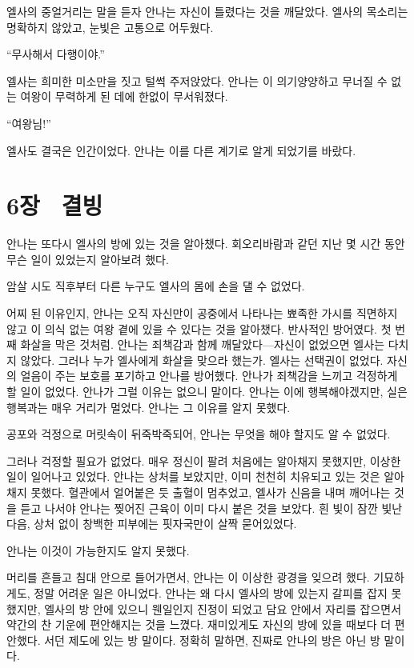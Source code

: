 엘사의 중얼거리는 말을 듣자 안나는 자신이 틀렸다는 것을 깨달았다. 엘사의 목소리는 명확하지 않았고, 눈빛은 고통으로 어두웠다.

``무사해서 다행이야.''

엘사는 희미한 미소만을 짓고 털썩 주저앉았다. 안나는 이 의기양양하고 무너질 수 없는 여왕이 무력하게 된 데에 한없이 무서워졌다.

``여왕님!''

엘사도 결국은 인간이었다. 안나는 이를 다른 계기로 알게 되었기를 바랐다.



\chapter[6장  결빙][{6장\hspace*{.5em}결빙}]{6장 \ 결빙}



안나는 또다시 엘사의 방에 있는 것을 알아챘다. 회오리바람과 같던 지난 몇 시간 동안 무슨 일이 있었는지 알아보려 했다.

암살 시도 직후부터 다른 누구도 엘사의 몸에 손을 댈 수 없었다.

어찌 된 이유인지, 안나는 오직 자신만이 공중에서 나타나는 뾰족한 가시를 직면하지 않고 이 의식 없는 여왕 곁에 있을 수 있다는 것을 알아챘다. 반사적인 방어였다. 첫 번째 화살을 막은 것처럼. 안나는 죄책감과 함께 깨달았다—자신이 없었으면 엘사는 다치지 않았다. 그러나 누가 엘사에게 화살을 맞으라 했는가. 엘사는 선택권이 없었다. 자신의 얼음이 주는 보호를 포기하고 안나를 방어했다. 안나가 죄책감을 느끼고 걱정하게 할 일이 없었다. 안나가 그럴 이유는 없으니 말이다. 안나는 이에 행복해야겠지만, 실은 행복과는 매우 거리가 멀었다. 안나는 그 이유를 알지 못했다.

공포와 걱정으로 머릿속이 뒤죽박죽되어, 안나는 무엇을 해야 할지도 알 수 없었다.

그러나 걱정할 필요가 없었다. 매우 정신이 팔려 처음에는 알아채지 못했지만, 이상한 일이 일어나고 있었다. 안나는 상처를 보았지만, 이미 천천히 치유되고 있는 것은 알아채지 못했다. 혈관에서 얼어붙은 듯 출혈이 멈추었고, 엘사가 신음을 내며 깨어나는 것을 듣고 나서야 안나는 찢어진 근육이 이미 다시 붙은 것을 보았다. 흰 빛이 잠깐 빛난 다음, 상처 없이 창백한 피부에는 핏자국만이 살짝 묻어있었다.

안나는 이것이 가능한지도 알지 못했다.

머리를 흔들고 침대 안으로 들어가면서, 안나는 이 이상한 광경을 잊으려 했다. 기묘하게도, 정말 어려운 일은 아니었다. 안나는 왜 다시 엘사의 방에 있는지 갈피를 잡지 못했지만, 엘사의 방 안에 있으니 웬일인지 진정이 되었고 담요 안에서 자리를 잡으면서 약간의 찬 기운에 편안해지는 것을 느꼈다. 재미있게도 자신의 방에 있을 때보다 더 편안했다. 서던 제도에 있는 방 말이다. 정확히 말하면, 진짜로 안나의 방은 아닌 방 말이다.

